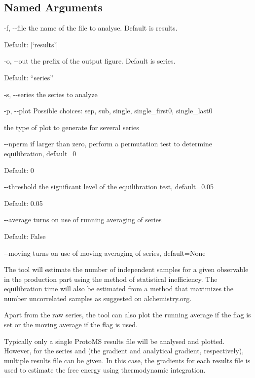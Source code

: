 \documentclass[letterpaper,10pt,english]{sphinxmanual}
\begin{document}
\subsection{Named Arguments}
\label{\detokenize{tools:Named Arguments}}\begin{optionlist}{3cm}
\item [-f, -{-}file]  
the name of the file to analyse. Default is results.

Default: {[}‘results’{]}
\item [-o, -{-}out]  
the prefix of the output figure. Default is series.

Default: “series”
\item [-s, -{-}series]  
the series to analyze
\item [-p, -{-}plot]  
Possible choices: sep, sub, single, single\_first0, single\_last0

the type of plot to generate for several series
\item [-{-}nperm]  
if larger than zero, perform a permutation test to determine equilibration, default=0

Default: 0
\item [-{-}threshold]  
the significant level of the equilibration test, default=0.05

Default: 0.05
\item [-{-}average]  
turns on use of running averaging of series

Default: False
\item [-{-}moving]  
turns on use of moving averaging of series, default=None
\end{optionlist}

The tool will estimate the number of independent samples for a given observable in the production part using the method of statistical inefficiency. The equilibration time will also be estimated from a method that maximizes the number uncorrelated samples as suggested on alchemistry.org.

Apart from the raw series, the tool can also plot the running average if the  flag is set or the moving average if the  flag is used.

Typically only a single ProtoMS results file will be analysed and plotted. However, for the series  and  (the gradient and analytical gradient, respectively), multiple results file can be given. In this case, the gradients for each results file is used to estimate the free energy using thermodynamic integration.
\end{document}
